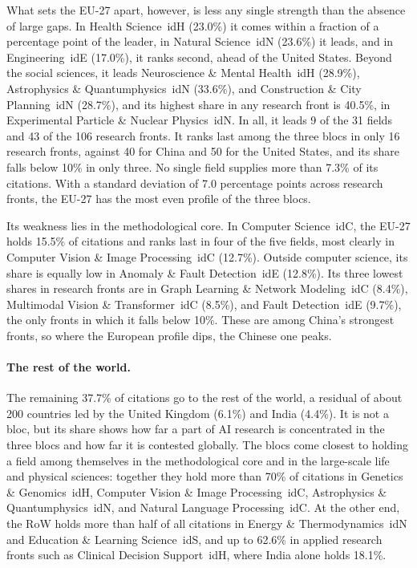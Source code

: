 \documentclass[10pt,twocolumn,a4paper]{article}
\newcommand{\cl}[3]{\textsf{#1}~\csname id#2\endcsname{#3}}
\begin{document}
	What sets the EU-27 apart, however, is less any single strength than the absence of large gaps. In \cl{Health Science}{H}{1} (23.0\%) it comes within a fraction of a percentage point of the leader, in \cl{Natural Science}{N}{3} (23.6\%) it leads, and in \cl{Engineering}{E}{4} (17.0\%), it ranks second, ahead of the United States. Beyond the social sciences, it leads \cl{Neuroscience \& Mental Health}{H}{11} (28.9\%), \cl{Astrophysics \& Quantumphysics}{N}{34} (33.6\%), and \cl{Construction \& City Planning}{N}{36} (28.7\%), and its highest share in any research front is 40.5\%, in \cl{Experimental Particle \& Nuclear Physics}{N}{342}. In all, it leads 9 of the 31 fields and 43 of the 106 research fronts. It ranks last among the three blocs in only 16 research fronts, against 40 for China and 50 for the United States, and its share falls below 10\% in only three. No single field supplies more than 7.3\% of its citations. With a standard deviation of 7.0 percentage points across research fronts, the EU-27 has the most even profile of the three blocs.
	
	Its weakness lies in the methodological core. In \cl{Computer Science}{C}{0}, the EU-27 holds 15.5\% of citations and ranks last in four of the five fields, most clearly in \cl{Computer Vision \& Image Processing}{C}{00} (12.7\%). Outside computer science, its share is equally low in \cl{Anomaly \& Fault Detection}{E}{42} (12.8\%). Its three lowest shares in research fronts are in \cl{Graph Learning \& Network Modeling}{C}{045} (8.4\%), \cl{Multimodal Vision \& Transformer}{C}{002} (8.5\%), and \cl{Fault Detection}{E}{422} (9.7\%), the only fronts in which it falls below 10\%. These are among China's strongest fronts, so where the European profile dips, the Chinese one peaks.
	
	\paragraph{The rest of the world.} The remaining 37.7\% of citations go to the rest of the world, a residual of about 200 countries led by the United Kingdom (6.1\%) and India (4.4\%). It is not a bloc, but its share shows how far a part of AI research is concentrated in the three blocs and how far it is contested globally. The blocs come closest to holding a field among themselves in the methodological core and in the large-scale life and physical sciences: together they hold more than 70\% of citations in \cl{Genetics \& Genomics}{H}{15}, \cl{Computer Vision \& Image Processing}{C}{00}, \cl{Astrophysics \& Quantumphysics}{N}{34}, and \cl{Natural Language Processing}{C}{01}. At the other end, the RoW holds more than half of all citations in \cl{Energy \& Thermodynamics}{N}{32} and \cl{Education \& Learning Science}{S}{20}, and up to 62.6\% in applied research fronts such as \cl{Clinical Decision Support}{H}{124}, where India alone holds 18.1\%.
	
\end{document}
